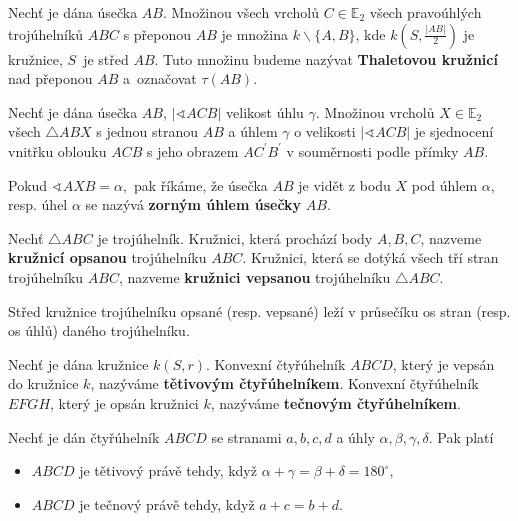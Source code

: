 \begin{definition}
  Nechť je dána úsečka $AB$. Množinou všech vrcholů $C\in \mathbb E_2$ všech pravoúhlých trojúhelníků $ABC$ s přeponou $AB$ je množina $k\smallsetminus\{ A,B\}$, kde $k\left (S,\frac{|AB|}{2}\right )$ je kružnice, $S$~je střed $AB$. Tuto množinu budeme nazývat \textbf{Thaletovou kružnicí} nad přeponou $AB$ a~označovat $\tau (AB).$
\end{definition}

\begin{veta}
  Nechť je dána úsečka $AB$, $|\sphericalangle ACB|$ velikost úhlu $\gamma.$ Množinou vrcholů $X\in \mathbb E_2$ všech $\triangle ABX$ s jednou stranou $AB$ a úhlem $\gamma$ o velikosti $|\sphericalangle ACB|$ je sjednocení vnitřku oblouku $ACB$ s jeho obrazem $AC^\prime B^\prime$ v souměrnosti podle přímky $AB$.
\end{veta}

\begin{pozn}
  Pokud $\sphericalangle AXB = \alpha,$ pak říkáme, že úsečka $AB$ je vidět z bodu $X$ pod úhlem $\alpha$, resp. úhel $\alpha$ se nazývá \textbf{zorným úhlem úsečky} $AB.$
\end{pozn}

\begin{definition}
  Nechť $\triangle ABC$ je trojúhelník. Kružnici, která prochází body $A,B,C$, nazveme \textbf{kružnicí opsanou} trojúhelníku $ABC$. Kružnici, která se dotýká všech tří stran trojúhelníku $ABC$, nazveme \textbf{kružnici vepsanou} trojúhelníku $\triangle ABC.$
\end{definition}

\begin{veta}
  Střed kružnice trojúhelníku opsané (resp. vepsané) leží v průsečíku os stran (resp. os úhlů) daného trojúhelníku.
\end{veta}

\begin{definition}
  Nechť je dána kružnice $k(S,r).$ Konvexní čtyřúhelník $ABCD$, který je vepsán do kružnice $k$, nazýváme \textbf{tětivovým čtyřúhelníkem}. Konvexní čtyřúhelník $EFGH$, který je opsán kružnici $k$, nazýváme \textbf{tečnovým čtyřúhelníkem}.
\end{definition}

\begin{veta}
  Nechť je dán čtyřúhelník $ABCD$ se stranami $a,b,c,d$ a úhly $\alpha, \beta, \gamma, \delta.$ Pak platí
  \begin{itemize}
    \item $ABCD$ je tětivový právě tehdy, když $\alpha + \gamma=\beta+\delta=180^\circ,$
    \item $ABCD$ je tečnový právě tehdy, když $a+c=b+d.$
  \end{itemize}
\end{veta}

